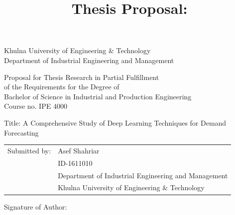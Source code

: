 \documentclass[fontsize=12pt,paper=a4]{scrartcl}
\title{Thesis Proposal: \tltle}
\author{\asef}
\newcommand{\tltle}{A Comprehensive Study of Deep Learning Techniques for Demand Forecasting}
\newcommand{\asef}{Asef Shahriar}
\begin{document}
\begin{spacing}{1}
    \begin{titlepage}
        \begin{center}
            Khulna University of Engineering \& Technology\\
            Department of Industrial Engineering and Management%
        \end{center}
        
        \begin{center}
            Proposal for Thesis Research in Partial Fulfillment\\
            of the Requirements for the Degree of\\
            Bachelor of Science in Industrial and Production Engineering\\
            \vspace{\baselineskip}
            Course no. IPE 4000
        \end{center}
        \vfill
        \begin{flushleft}
            Title: \tltle

            \vspace{\baselineskip}
            \begin{tabular}{@{}ll}
                Submitted by: & \asef\\
                & ID-1611010\\
                & Department of Industrial Engineering and Management\\
                & Khulna University of Engineering \& Technology
            \end{tabular}
         \vfill
            Signature of Author: 


\end{flushleft}
\end{titlepage}
\end{spacing}
\end{document}
